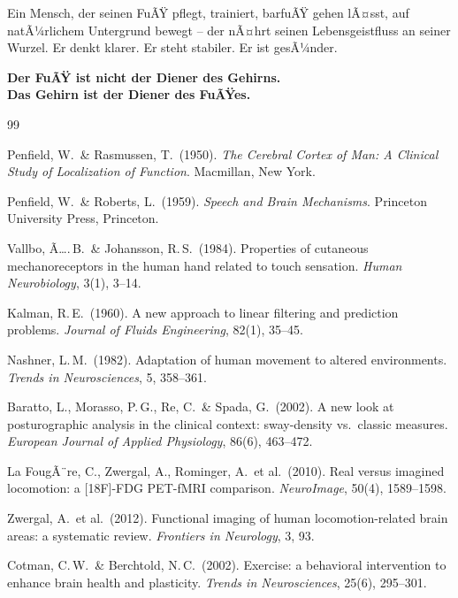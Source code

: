 ﻿\documentclass[12pt,a4paper]{report}
\theoremstyle{plain}
\theoremstyle{definition}
\theoremstyle{remark}
\begin{document}
Ein Mensch, der seinen FuÃŸ pflegt, trainiert, barfuÃŸ gehen
lÃ¤sst, auf natÃ¼rlichem Untergrund bewegt -- der nÃ¤hrt seinen
Lebensgeistfluss an seiner Wurzel. Er denkt klarer. Er steht
stabiler. Er ist gesÃ¼nder.

\textbf{Der FuÃŸ ist nicht der Diener des Gehirns.\\
Das Gehirn ist der Diener des FuÃŸes.}

\begin{thebibliography}{99}

Penfield, W.\ \& Rasmussen, T.\ (1950).
\textit{The Cerebral Cortex of Man: A Clinical Study of Localization of Function}.
Macmillan, New York.

Penfield, W.\ \& Roberts, L.\ (1959).
\textit{Speech and Brain Mechanisms}.
Princeton University Press, Princeton.

Vallbo, Ã….\,B.\ \& Johansson, R.\,S.\ (1984).
Properties of cutaneous mechanoreceptors in the human hand related to touch sensation.
\textit{Human Neurobiology}, 3(1), 3--14.

Kalman, R.\,E.\ (1960).
A new approach to linear filtering and prediction problems.
\textit{Journal of Fluids Engineering}, 82(1), 35--45.

Nashner, L.\,M.\ (1982).
Adaptation of human movement to altered environments.
\textit{Trends in Neurosciences}, 5, 358--361.

Baratto, L., Morasso, P.\,G., Re, C.\ \& Spada, G.\ (2002).
A new look at posturographic analysis in the clinical context: sway-density vs.\ classic measures.
\textit{European Journal of Applied Physiology}, 86(6), 463--472.

La FougÃ¨re, C., Zwergal, A., Rominger, A.\ et al.\ (2010).
Real versus imagined locomotion: a [18F]-FDG PET-fMRI comparison.
\textit{NeuroImage}, 50(4), 1589--1598.

Zwergal, A.\ et al.\ (2012).
Functional imaging of human locomotion-related brain areas: a systematic review.
\textit{Frontiers in Neurology}, 3, 93.

Cotman, C.\,W.\ \& Berchtold, N.\,C.\ (2002).
Exercise: a behavioral intervention to enhance brain health and plasticity.
\textit{Trends in Neurosciences}, 25(6), 295--301.


\end{thebibliography}
\end{document}
